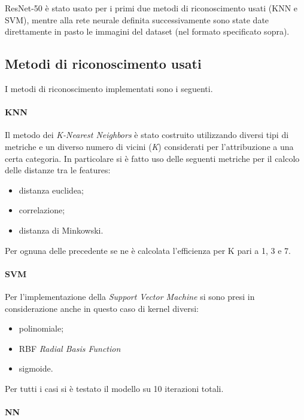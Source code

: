 \documentclass[11pt, a4paper, titlepage]{article}
\begin{document}
ResNet-50 è stato usato per i primi due metodi di riconoscimento usati (KNN e SVM), mentre alla rete neurale definita successivamente sono state date direttamente in pasto le immagini del dataset (nel formato specificato sopra).
 
\subsection{Metodi di riconoscimento usati}
I metodi di riconoscimento implementati sono i seguenti. 

\paragraph{KNN}
Il metodo dei \emph{K-Nearest Neighbors} è stato costruito utilizzando diversi tipi di metriche e un diverso numero di vicini (\emph{K}) considerati per l'attribuzione a una certa categoria. In particolare si è fatto uso delle seguenti metriche per il calcolo delle distanze tra le features:
\begin{itemize}
    \item distanza euclidea;
    \item correlazione;
    \item distanza di Minkowski.
\end{itemize}
Per ognuna delle precedente se ne è calcolata l'efficienza per K pari a 1, 3 e 7.

\paragraph{SVM}
Per l'implementazione della \emph{Support Vector Machine} si sono presi in considerazione anche in questo caso di kernel diversi:
\begin{itemize}
    \item polinomiale;
    \item RBF \emph{Radial Basis Function}
    \item sigmoide.
\end{itemize}
Per tutti i casi si è testato il modello su 10 iterazioni totali. 

\paragraph{NN}


\pagebreak
{}

\end{document}

